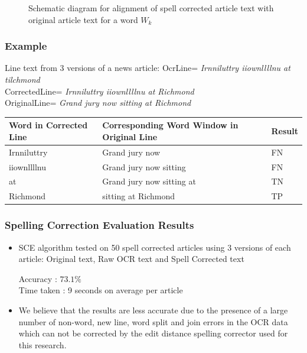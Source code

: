 \documentclass{beamer}
\begin{document}
\begin{frame}
\begin{columns}
\end{columns}
\begin{figure}
\caption{Schematic diagram for alignment of spell corrected article text with original article text for a word $W_{k}$}
\end{figure}
\end{frame}



\begin{frame}
\frametitle{Example}

\begin{block}{Line text from 3 versions of a news article:}
OcrLine= \textit{Irnniluttry iiownllllnu at tilchmond}\\

CorrectedLine= \textit{Irnniluttry iiownllllnu at Richmond}\\

OriginalLine= \textit{Grand jury now sitting at Richmond} 
\end{block}

\begin{table}[bt]
\begin{tabular}{|p{2.5cm}|p{4.5cm}|p{2cm}|} \hline
\textbf{Word in Corrected Line} & \textbf{Corresponding Word Window in Original Line}& \textbf{Result} \\ \hline
Irnniluttry & Grand jury now & FN \\ \hline
iiownllllnu & Grand jury now sitting & FN \\ \hline
at & Grand jury now sitting at & TN \\ \hline
Richmond  &  sitting at Richmond & TP \\ \hline
\end{tabular}
\end{table}
\end{frame}

\begin{frame}
\frametitle{Spelling Correction Evaluation Results}
\begin{itemize}

 \justifying
\item
SCE algorithm tested on 50 spell corrected articles using 3 versions of each article: Original text, Raw OCR text and Spell Corrected text

\begin{block}{}
Accuracy :  $73.1 \%$\\
Time taken : 9 seconds on average per article
\end{block}


\item
We believe that the results are less accurate due to the presence of a large number of non-word, new line, word split and join errors in the OCR data which can not
be corrected by the edit distance spelling corrector used for this research.
\end{itemize}
\end{frame}
\end{document}
